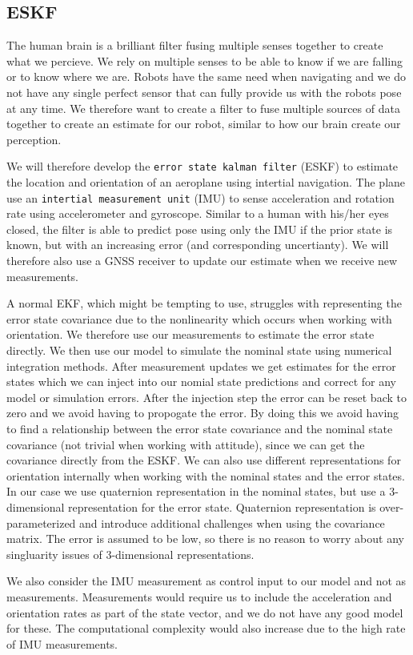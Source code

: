 \subsection{ESKF}
The human brain is a brilliant filter fusing multiple senses together to create what we percieve. We rely on multiple senses to be able to know if we are falling or to know where we are. 
Robots have the same need when navigating and we do not have any single perfect sensor that can fully provide us with the robots pose at any time. We therefore want to create a filter to fuse multiple sources of data together to create an estimate for our robot, similar to how our brain create our perception.

We will therefore develop the \texttt{error state kalman filter} (ESKF) to estimate the location and orientation of an aeroplane using intertial navigation. The plane use an \texttt{intertial measurement unit} (IMU) to sense acceleration and rotation rate using accelerometer and gyroscope. Similar to a human with his/her eyes closed, the filter is able to predict pose using only the IMU if the prior state is known, but with an increasing error (and corresponding uncertianty). We will therefore also use a GNSS receiver to update our estimate when we receive new measurements. 

A normal EKF, which might be tempting to use, struggles with representing the error state covariance due to the nonlinearity which occurs when working with orientation. We therefore use our measurements to estimate the error state directly. We then use our model to simulate the nominal state using numerical integration methods. After measurement updates we get estimates for the error states which we can inject into our nomial state predictions and correct for any model or simulation errors. After the injection step the error can be reset back to zero and we avoid having to propogate the error. 
By doing this we avoid having to find a relationship between the error state covariance and the nominal state covariance (not trivial when working with attitude), since we can get the covariance directly from the ESKF. We can also use different representations for orientation internally when working with the nominal states and the error states. In our case we use quaternion representation in the nominal states, but use a 3-dimensional representation for the error state. Quaternion representation is over-parameterized and introduce additional challenges when using the covariance matrix. The error is assumed to be low, so there is no reason to worry about any singluarity issues of 3-dimensional representations. 

We also consider the IMU measurement as control input to our model and not as measurements. Measurements would require us to include the acceleration and orientation rates as part of the state vector, and we do not have any good model for these. The computational complexity would also increase due to the high rate of IMU measurements.